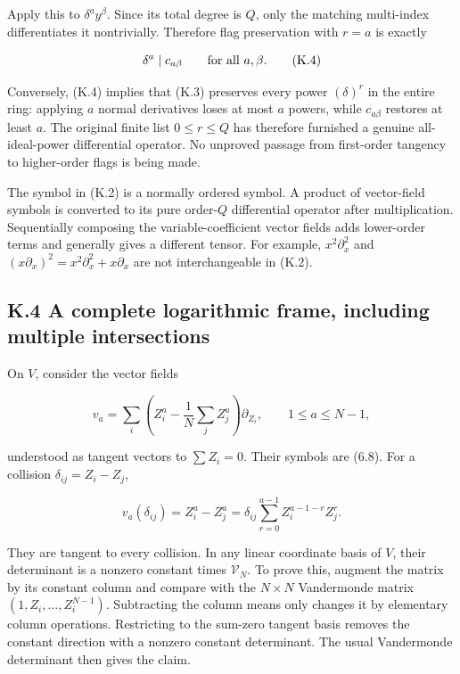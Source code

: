 Apply this to \(\delta^ay^\beta\). Since its total degree is \(Q\), only the matching multi-index differentiates it nontrivially. Therefore flag preservation with \(r=a\) is exactly

\[
\delta^a\mid c_{a\beta}\qquad\hbox{for all }a,\beta.
\tag{K.4}
\]

Conversely, (K.4) implies that (K.3) preserves every power \((\delta)^r\) in the entire ring: applying \(a\) normal derivatives loses at most \(a\) powers, while \(c_{a\beta}\) restores at least \(a\). The original finite list \(0\le r\le Q\) has therefore furnished a genuine all-ideal-power differential operator. No unproved passage from first-order tangency to higher-order flags is being made.

The symbol in (K.2) is a normally ordered symbol. A product of vector-field symbols is converted to its pure order-\(Q\) differential operator after multiplication. Sequentially composing the variable-coefficient vector fields adds lower-order terms and generally gives a different tensor. For example, \(x^2\partial_x^2\) and \((x\partial_x)^2=x^2\partial_x^2+x\partial_x\) are not interchangeable in (K.2).

\hypertarget{k.4-a-complete-logarithmic-frame-including-multiple-intersections}{%
\subsection{K.4 A complete logarithmic frame, including multiple intersections}\label{k.4-a-complete-logarithmic-frame-including-multiple-intersections}}

On \(V\), consider the vector fields

\[
v_a=\sum_i\left(Z_i^a-\frac1N\sum_jZ_j^a\right)\partial_{Z_i},
\qquad 1\le a\le N-1,
\tag{K.5}
\]

understood as tangent vectors to \(\sum Z_i=0\). Their symbols are (6.8). For a collision \(\delta_{ij}=Z_i-Z_j\),

\[
v_a(\delta_{ij})=Z_i^a-Z_j^a
=\delta_{ij}\sum_{r=0}^{a-1}Z_i^{a-1-r}Z_j^r.
\tag{K.6}
\]

They are tangent to every collision. In any linear coordinate basis of \(V\), their determinant is a nonzero constant times \(\mathcal V_N\). To prove this, augment the matrix by its constant column and compare with the \(N\times N\) Vandermonde matrix \((1,Z_i,\ldots,Z_i^{N-1})\). Subtracting the column means only changes it by elementary column operations. Restricting to the sum-zero tangent basis removes the constant direction with a nonzero constant determinant. The usual Vandermonde determinant then gives the claim.

